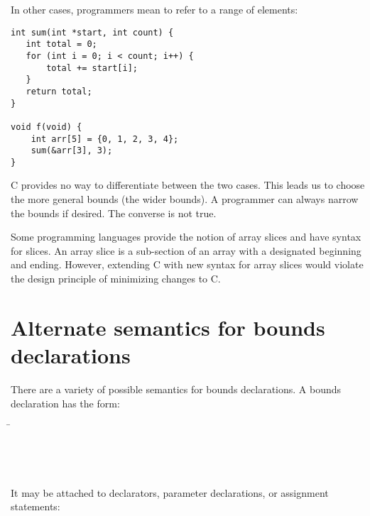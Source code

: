 In other cases, programmers mean to refer to a range of elements:
\begin{lstlisting}
int sum(int *start, int count) {
   int total = 0;
   for (int i = 0; i < count; i++) {
       total += start[i];
   }
   return total;
}

void f(void) {
    int arr[5] = {0, 1, 2, 3, 4};
    sum(&arr[3], 3);
}
\end{lstlisting}

C provides no way to differentiate between the two cases. 
This leads us to choose the more general bounds (the wider bounds).
A programmer can always narrow the bounds if desired.  The converse is not
true.

Some programming languages provide the notion of array slices and have syntax for slices. 
An array slice is a sub-section of an array with a designated beginning and ending.
However, extending C with new syntax for array slices would violate the design
principle of minimizing changes to C.

\section{Alternate semantics for bounds declarations}
\label{section:bounds-declarations-alternate-semantics}

There are a variety of possible semantics for
bounds declarations. A bounds declaration has the form:

\begin{quote}
\end{quote}

\begin{tabbing}
\= \\
\> \code{)} \\
\>  \\
\> \boundsunknown \\
\> \boundsany
\end{tabbing}

It may be attached to declarators, parameter declarations, or assignment statements:

